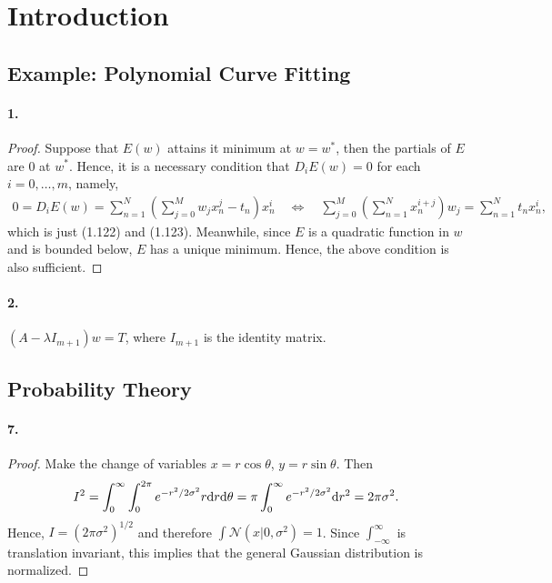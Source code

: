 \section{Introduction}
\subsection{Example: Polynomial Curve Fitting}
  \paragraph{1.}
  \begin{proof}
    Suppose that $E(w)$ attains it minimum at $w=w^*$, then the partials of $E$ 
    are $0$ at $w^*$. Hence, it is a necessary condition that $D_iE(w)=0$ for 
    each $i=0,\dots,m$, namely,
    \begin{align*}
      0=D_iE(w)=\sum_{n=1}^N\left(\sum_{j=0}^Mw_jx_n^j-t_n\right)x_n^i
      \quad\Leftrightarrow\quad
      \sum_{j=0}^M\left(\sum_{n=1}^Nx_n^{i+j}\right)w_j=\sum_{n=1}^Nt_nx_n^i,
    \end{align*}
    which is just (1.122) and (1.123). Meanwhile, since $E$ is a quadratic 
    function in $w$ and is bounded below, $E$ has a unique minimum. Hence, the
    above condition is also sufficient.
  \end{proof}

  \paragraph{2.}
  \begin{solution}
    $(A-\lambda I_{m+1})w=T$, where $I_{m+1}$ is the identity matrix.
  \end{solution}
\subsection{Probability Theory}
  \paragraph{7.}
  \begin{proof}
    Make the change of variables $x=r\cos\theta$, $y=r\sin\theta$. Then
    \begin{align*}
      I^2
      =\int_0^\infty\int_0^{2\pi}e^{-r^2/2\sigma^2}r\mathrm{d} r\mathrm{d}\theta
      =\pi\int_0^\infty e^{-r^2/2\sigma^2}\mathrm{d} r^2
      = 2\pi\sigma^2.
    \end{align*}
    Hence, $I=(2\pi\sigma^2)^{1/2}$ and therefore $\int\mathcal{N}(x|0,\sigma^2)
    =1$. Since $\int_{-\infty}^\infty$ is translation invariant, this implies 
    that the general Gaussian distribution is normalized.
  \end{proof}
  
